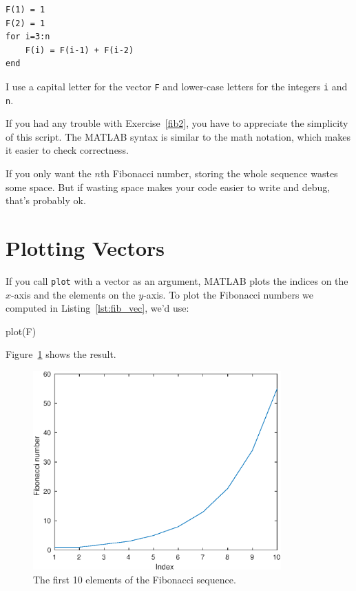 \begin{lstlisting}[caption={Calculating the Fibonacci sequence using a vector }, label={lst:fib_vec}]
F(1) = 1
F(2) = 1
for i=3:n
    F(i) = F(i-1) + F(i-2)
end
\end{lstlisting}

I use a capital letter for the vector {\tt F}
and lower-case letters for the integers {\tt i} and {\tt n}.

If you had any trouble with Exercise~\ref{fib2}, you have to
appreciate the simplicity of this script.  The MATLAB syntax is
similar to the math notation, which makes it easier to check
correctness.  

If you only want the $n$th Fibonacci number, storing
the whole sequence wastes some space.  But if wasting space
makes your code easier to write and debug, that's probably ok.


\section{Plotting Vectors}


If you call {\tt plot} with a vector as an argument,
MATLAB plots the indices on the $x$-axis and the elements on the
$y$-axis.  To plot the Fibonacci numbers we computed in Listing~\ref{lst:fib_vec}, we'd use:

\begin{code}
plot(F)
\end{code}

Figure~\ref{fig:fibonacci} shows the result.

\begin{figure}[h]
\centerline{\includegraphics[height=3in]{book/figs/fibonacci.eps}}
\caption{The first 10 elements of the Fibonacci sequence.}
\label{fig:fibonacci}
\end{figure}

